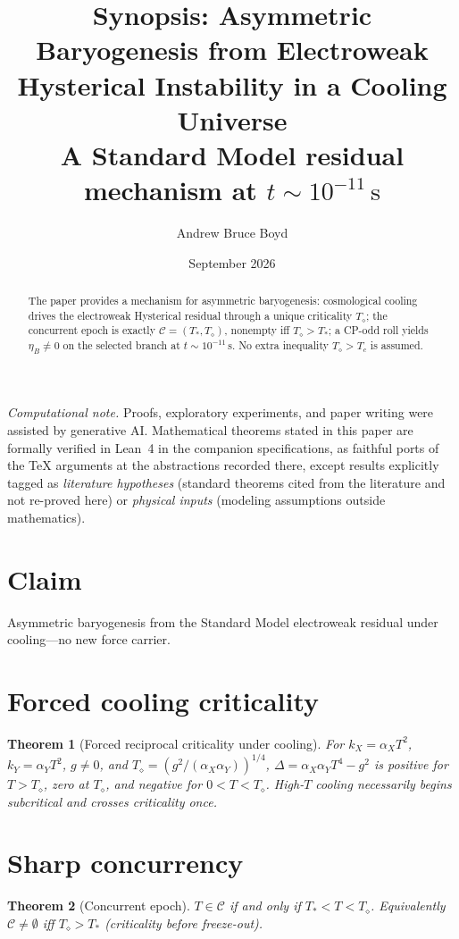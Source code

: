 \documentclass[11pt]{article}
\title{\textbf{Synopsis: Asymmetric Baryogenesis from Electroweak Hysterical Instability in a Cooling Universe}\\[0.35em]
\large A Standard Model residual mechanism at $t\sim10^{-11}\,\mathrm{s}$}
\author{Andrew Bruce Boyd}
\date{September 2026}
\newtheorem{theorem}{Theorem}[section]
\theoremstyle{definition}
\newcommand{\Td}{T_{\diamond}}
\begin{document}
\maketitle
\noindent\textit{Computational note.}
Proofs, exploratory experiments, and paper writing were assisted by generative AI.
Mathematical theorems stated in this paper are formally verified in Lean~4 in the
companion specifications, as faithful ports of the TeX arguments at the abstractions
recorded there, except results explicitly tagged as \emph{literature hypotheses}
(standard theorems cited from the literature and not re-proved here) or
\emph{physical inputs} (modeling assumptions outside mathematics).

\begin{abstract}
The paper provides a mechanism for asymmetric baryogenesis: cosmological cooling
drives the electroweak Hysterical residual through a unique criticality $\Td$;
the concurrent epoch is exactly $\mathcal C=(T_*,\Td)$, nonempty iff $\Td>T_*$;
a CP-odd roll yields $\eta_B\neq0$ on the selected branch at
$t\sim10^{-11}\,\mathrm{s}$.
No extra inequality $\Td>T_c$ is assumed.
\end{abstract}

\section{Claim}
Asymmetric baryogenesis from the Standard Model electroweak residual under
cooling---no new force carrier.

\section{Forced cooling criticality}
\begin{theorem}[Forced reciprocal criticality under cooling]
For $k_X=\alpha_X T^2$, $k_Y=\alpha_Y T^2$, $g\neq0$, and
$\Td=(g^2/(\alpha_X\alpha_Y))^{1/4}$,
$\Delta=\alpha_X\alpha_Y T^4-g^2$ is positive for $T>\Td$, zero at $\Td$, and
negative for $0<T<\Td$.
High-$T$ cooling necessarily begins subcritical and crosses criticality once.
\end{theorem}

\section{Sharp concurrency}
\begin{theorem}[Concurrent epoch]
$T\in\mathcal C$ if and only if $T_*<T<\Td$.
Equivalently $\mathcal C\neq\emptyset$ iff $\Td>T_*$
(criticality before freeze-out).
\end{theorem}
\end{document}
